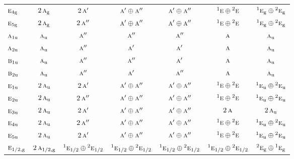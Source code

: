 \documentclass[10pt,a4paper]{article}
\numberwithin{equation}{section}
\newcommand{\irr}[1]{\text{\normalfont\scshape #1}}
\newcommand{\conjpair}[1]{{}^{#1}}
\newcommand{\ptag}[1]{\mathrm{#1}}
\begin{document}
{\begin{longtable}{@{}lcccccc@{}}
$\irr{e}_{4\ptag{g}}$ & $2\,\irr{a}_{\ptag{g}}$ & $2\,\irr{a}'$ & $\irr{a}'\oplus \irr{a}''$ & $\irr{a}'\oplus \irr{a}''$ & $\conjpair{1}\irr{e}\oplus \conjpair{2}\irr{e}$ & $\conjpair{1}\irr{e}_{\ptag{g}}\oplus \conjpair{2}\irr{e}_{\ptag{g}}$\\
$\irr{e}_{5\ptag{g}}$ & $2\,\irr{a}_{\ptag{g}}$ & $2\,\irr{a}''$ & $\irr{a}'\oplus \irr{a}''$ & $\irr{a}'\oplus \irr{a}''$ & $\conjpair{1}\irr{e}\oplus \conjpair{2}\irr{e}$ & $\conjpair{1}\irr{e}_{\ptag{g}}\oplus \conjpair{2}\irr{e}_{\ptag{g}}$\\
$\irr{a}_{1\ptag{u}}$ & $\irr{a}_{\ptag{u}}$ & $\irr{a}''$ & $\irr{a}''$ & $\irr{a}''$ & $\irr{a}$ & $\irr{a}_{\ptag{u}}$\\
$\irr{a}_{2\ptag{u}}$ & $\irr{a}_{\ptag{u}}$ & $\irr{a}''$ & $\irr{a}'$ & $\irr{a}'$ & $\irr{a}$ & $\irr{a}_{\ptag{u}}$\\
$\irr{b}_{1\ptag{u}}$ & $\irr{a}_{\ptag{u}}$ & $\irr{a}''$ & $\irr{a}''$ & $\irr{a}'$ & $\irr{a}$ & $\irr{a}_{\ptag{u}}$\\
$\irr{b}_{2\ptag{u}}$ & $\irr{a}_{\ptag{u}}$ & $\irr{a}''$ & $\irr{a}'$ & $\irr{a}''$ & $\irr{a}$ & $\irr{a}_{\ptag{u}}$\\
$\irr{e}_{1\ptag{u}}$ & $2\,\irr{a}_{\ptag{u}}$ & $2\,\irr{a}'$ & $\irr{a}'\oplus \irr{a}''$ & $\irr{a}'\oplus \irr{a}''$ & $\conjpair{1}\irr{e}\oplus \conjpair{2}\irr{e}$ & $\conjpair{1}\irr{e}_{\ptag{u}}\oplus \conjpair{2}\irr{e}_{\ptag{u}}$\\
$\irr{e}_{2\ptag{u}}$ & $2\,\irr{a}_{\ptag{u}}$ & $2\,\irr{a}''$ & $\irr{a}'\oplus \irr{a}''$ & $\irr{a}'\oplus \irr{a}''$ & $\conjpair{1}\irr{e}\oplus \conjpair{2}\irr{e}$ & $\conjpair{1}\irr{e}_{\ptag{u}}\oplus \conjpair{2}\irr{e}_{\ptag{u}}$\\
$\irr{e}_{3\ptag{u}}$ & $2\,\irr{a}_{\ptag{u}}$ & $2\,\irr{a}'$ & $\irr{a}'\oplus \irr{a}''$ & $\irr{a}'\oplus \irr{a}''$ & $2\,\irr{a}$ & $2\,\irr{a}_{\ptag{u}}$\\
$\irr{e}_{4\ptag{u}}$ & $2\,\irr{a}_{\ptag{u}}$ & $2\,\irr{a}''$ & $\irr{a}'\oplus \irr{a}''$ & $\irr{a}'\oplus \irr{a}''$ & $\conjpair{1}\irr{e}\oplus \conjpair{2}\irr{e}$ & $\conjpair{1}\irr{e}_{\ptag{u}}\oplus \conjpair{2}\irr{e}_{\ptag{u}}$\\
$\irr{e}_{5\ptag{u}}$ & $2\,\irr{a}_{\ptag{u}}$ & $2\,\irr{a}'$ & $\irr{a}'\oplus \irr{a}''$ & $\irr{a}'\oplus \irr{a}''$ & $\conjpair{1}\irr{e}\oplus \conjpair{2}\irr{e}$ & $\conjpair{1}\irr{e}_{\ptag{u}}\oplus \conjpair{2}\irr{e}_{\ptag{u}}$\\
$\irr{e}_{1/2,\ptag{g}}$ & $2\,\irr{a}_{1/2,\ptag{g}}$ & $\conjpair{1}\irr{e}_{1/2}\oplus \conjpair{2}\irr{e}_{1/2}$ & $\conjpair{1}\irr{e}_{1/2}\oplus \conjpair{2}\irr{e}_{1/2}$ & $\conjpair{1}\irr{e}_{1/2}\oplus \conjpair{2}\irr{e}_{1/2}$ & $\conjpair{1}\irr{e}_{1/2}\oplus \conjpair{2}\irr{e}_{1/2}$ & $\conjpair{2}\irr{e}_{\ptag{g}}\oplus \conjpair{1}\irr{e}_{\ptag{g}}$\\

\end{longtable}}
\end{document}
